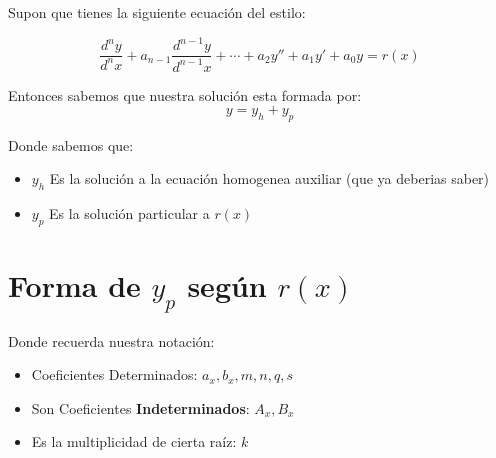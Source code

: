 \documentclass[12pt]{report}                               %
\begin{document}
        Supon que tienes la siguiente ecuación del estilo:

        \begin{equation}
            \frac{d^ny}{d^nx} + a_{n-1}\frac{d^{n-1}y}{d^{n-1}x} + \cdots + a_2y'' + a_1y' + a_0y = r(x)
        \end{equation}

        Entonces sabemos que nuestra solución esta formada por:
        \begin{equation}
            y = y_h + y_p
        \end{equation}

        Donde sabemos que:
        \begin{itemize}
            \item $y_h$ Es la solución a la ecuación homogenea auxiliar (que ya deberias saber)
            \item $y_p$ Es la solución particular a $r(x)$
        \end{itemize}


    \section{Forma de $y_p$ según $r(x)$}

        Donde recuerda nuestra notación:
        \begin{itemize}
            \item Coeficientes Determinados: $a_x, b_x, m, n, q, s$
            \item Son Coeficientes \textbf{Indeterminados}: $A_x , B_x$ 
            \item Es la multiplicidad de cierta raíz: $k$
        \end{itemize}
\end{document}
